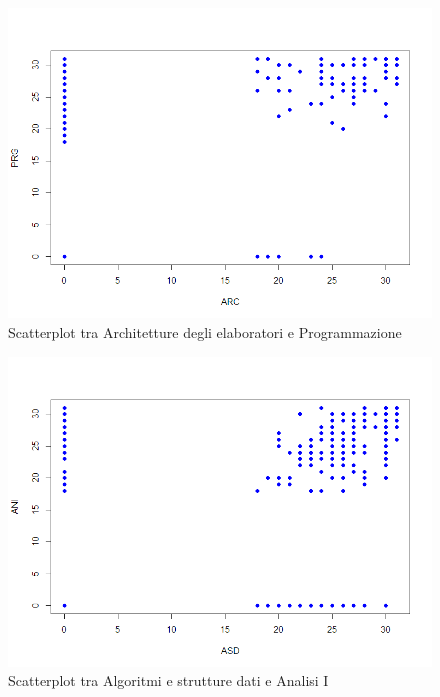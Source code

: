\documentclass[12pt]{article}
\begin{document}
\begin{figure}[H]
	\centering
	\includegraphics[width=\textwidth]{img/arcPrg.png}
	\caption{Scatterplot tra Architetture degli elaboratori e Programmazione}
\end{figure}

\begin{figure}[H]
	\centering
	\includegraphics[width=\textwidth]{img/asdAni.png}
	\caption{Scatterplot tra Algoritmi e strutture dati e Analisi I}
\end{figure}
\end{document}
